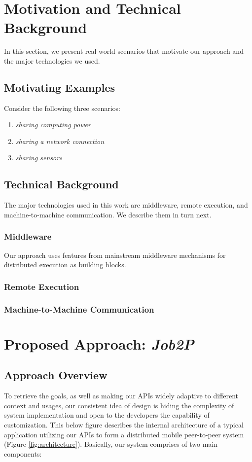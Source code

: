 \documentclass[conference]{IEEEtran}
\begin{document}
\section{Motivation and Technical Background}
In this section, we present real world scenarios that motivate our approach and the major technologies we used.

\subsection{Motivating Examples}
Consider the following three scenarios:
\begin{enumerate}
\item \emph{sharing computing power} 
\item \emph{sharing a network connection}
\item \emph{sharing sensors}
\end{enumerate}

\subsection{Technical Background}
The major technologies used in this work are middleware, remote execution, and machine-to-machine communication. We describe them in turn next.

\subsubsection{Middleware}
Our approach uses features from mainstream middleware mechanisms for distributed execution as building blocks. 


\subsubsection{Remote Execution}
\subsubsection{Machine-to-Machine Communication}

\section{Proposed Approach: \emph{Job2P}}

\subsection{Approach Overview}
To retrieve the goals, as well as making our APIs widely adaptive to different context and usages, our consistent idea of design is hiding the complexity of system implementation and open to the developers the capability of customization. This below figure describes the internal architecture of a typical application utilizing our APIs to form a distributed mobile peer-to-peer system (Figure \ref{fig:architecture}). Basically, our system comprises of two main components:
\end{document}
